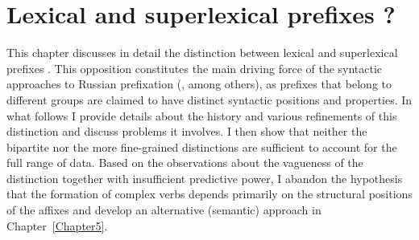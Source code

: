 


\chapter{Lexical and superlexical prefixes ?} 
\label{Chapter4}

This chapter discusses in detail the distinction between lexical and superlexical prefixes . This opposition constitutes the main driving force of the syntactic approaches to Russian prefixation  (\citealt{Ramchand:04, Svenonius:04b, Romanova:06}, among others), as prefixes that belong to different groups are claimed to have distinct syntactic positions  and properties. In what follows I provide details about the history and various refinements of this distinction and discuss problems it involves. I then show that neither the bipartite nor the more fine-grained distinctions are sufficient to account for the full range of data. Based on the observations about the vagueness of the distinction together with insufficient predictive power, I abandon the hypothesis that the formation of complex verbs  depends primarily on the structural positions of the affixes and develop an alternative (semantic) approach in Chapter~\ref{Chapter5}.

